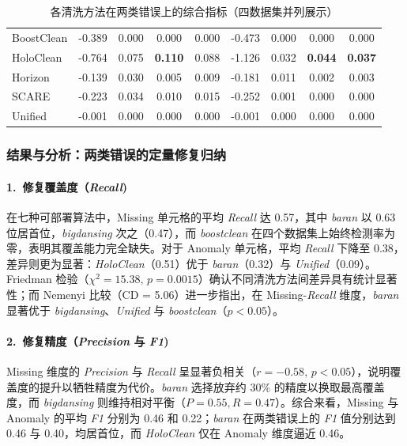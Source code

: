 \documentclass[10pt]{article} %
\numberwithin{equation}{section}
\begin{document}
\begin{table}[htbp]
\begin{subtable}[t]{0.492\linewidth}
\begin{tabular}{lcccccccc}
BoostClean  & -0.389 & 0.000 & 0.000 & 0.000 & -0.473 & 0.000 & 0.000 & 0.000 \\
HoloClean   & -0.764 & 0.075 & \textbf{0.110} & 0.088 & -1.126 & 0.032 & \textbf{0.044} & \textbf{0.037} \\
Horizon     & -0.139 & 0.030 & 0.005 & 0.009 & -0.181 & 0.011 & 0.002 & 0.003 \\
SCARE       & -0.223 & 0.034 & 0.010 & 0.015 & -0.252 & 0.001 & 0.000 & 0.000 \\
Unified     & -0.001 & 0.000 & 0.000 & 0.000 & -0.001 & 0.000 & 0.000 & 0.000 \\
\bottomrule
\end{tabular}
\end{subtable}

\caption{各清洗方法在两类错误上的综合指标（四数据集并列展示）}
\label{tab:q1-acc-all}
\end{table}

\vspace{-1em}


\subsubsection*{结果与分析：两类错误的定量修复归纳}
\label{sec:q1-refined-discussion}

\paragraph{1.~修复覆盖度（\textit{Recall})}
在七种可部署算法中，Missing 单元格的平均 \textit{Recall} 达 0.57，其中 \textit{baran} 以 0.63 位居首位，\textit{bigdansing} 次之（0.47），而 \textit{boostclean} 在四个数据集上始终检测率为零，表明其覆盖能力完全缺失。对于 Anomaly 单元格，平均 \textit{Recall} 下降至 0.38，差异则更为显著：\textit{HoloClean}（0.51）优于 \textit{baran}（0.32）与 \textit{Unified}（0.09）。Friedman 检验（$\chi^{2}=15.38,\,p=0.0015$）确认不同清洗方法间差异具有统计显著性；而 Nemenyi 比较（CD = 5.06）进一步指出，在 Missing-\textit{Recall} 维度，\textit{baran} 显著优于 \textit{bigdansing}、\textit{Unified} 与 \textit{boostclean}（$p<0.05$）。

\paragraph{2.~修复精度（\textit{Precision} 与 \textit{F1})}
Missing 维度的 \textit{Precision} 与 \textit{Recall} 呈显著负相关（$r=-0.58,\,p<0.05$），说明覆盖度的提升以牺牲精度为代价。\textit{baran} 选择放弃约 30\% 的精度以换取最高覆盖度，而 \textit{bigdansing} 则维持相对平衡（$P=0.55,R=0.47$）。综合来看，Missing 与 Anomaly 的平均 \textit{F1} 分别为 0.46 和 0.22；\textit{baran} 在两类错误上的 \textit{F1} 值分别达到 0.46 与 0.40，均居首位，而 \textit{HoloClean} 仅在 Anomaly 维度逼近 0.46。
\end{document}
